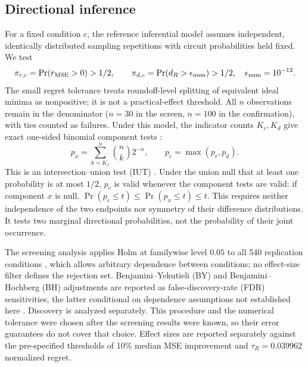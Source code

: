 \subsection{Directional inference}\label{sec:directional}
For a fixed condition $c$, the reference inferential model assumes independent, identically distributed sampling repetitions with circuit probabilities held fixed. We test
\begin{equation}
 \pi_{r,c}=\Pr(r_{\operatorname{MSE}}>0)>1/2,\qquad
 \pi_{d,c}=\Pr(d_R>\epsilon_{\rm num})>1/2,\quad\epsilon_{\rm num}=10^{-12}.\label{eq:estimand}
\end{equation}
The small regret tolerance treats roundoff-level splitting of equivalent ideal minima as nonpositive; it is not a practical-effect threshold. All $n$ observations remain in the denominator ($n=30$ in the screen, $n=100$ in the confirmation), with ties counted as failures. Under this model, the indicator counts $K_r,K_d$ give exact one-sided binomial component tests \citep{LehmannRomano2005}:
\begin{equation}
 p_x=\sum_{k=K_x}^{n}{n\choose k}2^{-n},\qquad p_c=\max(p_r,p_d).\label{eq:sign}
\end{equation}
This is an intersection--union test (IUT) \citep{Berger1982IUT}. Under the union null that at least one probability is at most $1/2$, $p_c$ is valid whenever the component tests are valid: if component $x$ is null, $\Pr(p_c\le t)\le\Pr(p_x\le t)\le t$. This requires neither independence of the two endpoints nor symmetry of their difference distributions. It tests two marginal directional probabilities, not the probability of their joint occurrence.

The screening analysis applies Holm at familywise level $0.05$ to all 540 replication conditions \citep{Holm1979}, which allows arbitrary dependence between conditions; no effect-size filter defines the rejection set. Benjamini--Yekutieli (BY) and Benjamini--Hochberg (BH) adjustments are reported as false-discovery-rate (FDR) sensitivities, the latter conditional on dependence assumptions not established here \citep{BenjaminiYekutieli2001}. Discovery is analyzed separately. This procedure and the numerical tolerance were chosen after the screening results were known, so their error guarantees do not cover that choice. Effect sizes are reported separately against the pre-specified thresholds of 10\% median MSE improvement and $\tau_R=0.039962$ normalized regret.

